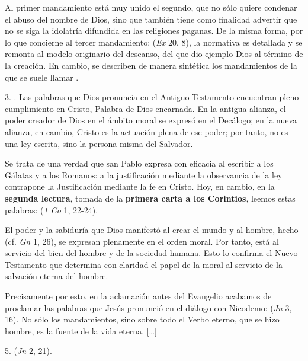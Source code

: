 \begin{body}
Al primer mandamiento está muy unido el segundo, que no sólo quiere condenar el abuso del nombre de Dios, sino que también tiene como finalidad advertir que no se siga la idolatría difundida en las religiones paganas. De la misma forma, por lo que concierne al tercer mandamiento:  (\textit{Ex} 20, 8), la normativa es detallada y se remonta al modelo originario del descanso, del que dio ejemplo Dios al término de la creación. En cambio, se describen de manera sintética los mandamientos de la que se suele llamar .

3. . Las palabras que Dios pronuncia en el Antiguo Testamento encuentran pleno cumplimiento en Cristo, Palabra de Dios encarnada. En la antigua alianza, el poder creador de Dios en el ámbito moral se expresó en el Decálogo; en la nueva alianza, en cambio, Cristo es la actuación plena de ese poder; por tanto, no es una ley escrita, sino la persona misma del Salvador.

Se trata de una verdad que san Pablo expresa con eficacia al escribir a los Gálatas y a los Romanos: a la justificación mediante la observancia de la ley contrapone la Justificación mediante la fe en Cristo. Hoy, en cambio, en la \textbf{segunda lectura}, tomada de la \textbf{primera carta a los Corintios}, leemos estas palabras:  (\textit{1 Co} 1, 22-24).

El poder y la sabiduría que Dios manifestó al crear el mundo y al hombre, hecho  (cf. \textit{Gn} 1, 26), se expresan plenamente en el orden moral. Por tanto, está al servicio del bien del hombre y de la sociedad humana. Esto lo confirma el Nuevo Testamento que determina con claridad el papel de la moral al servicio de la salvación eterna del hombre.

Precisamente por esto, en la aclamación antes del Evangelio acabamos de proclamar las palabras que Jesús pronunció en el diálogo con Nicodemo:  (\textit{Jn} 3, 16). No sólo los mandamientos, sino sobre todo el Verbo eterno, que se hizo hombre, es la fuente de la vida eterna. [\ldots]

5.  (\textit{Jn} 2, 21).


\end{body}
